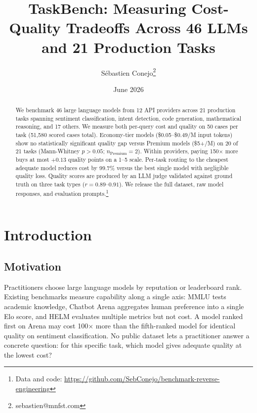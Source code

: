 \documentclass[11pt]{article}
\title{TaskBench: Measuring Cost-Quality Tradeoffs Across 46 LLMs and 21 Production Tasks}
\author{S\'{e}bastien Conejo\thanks{sebastien@mnfst.com}}
\date{June 2026}
\begin{document}
\maketitle

\begin{abstract}
We benchmark 46 large language models from 12 API providers across 21
production tasks spanning sentiment classification, intent detection,
code generation, mathematical reasoning, and 17 others.  We measure both
per-query cost and quality on 50 cases per task (51,580 scored cases
total).  Economy-tier models (\$0.05--\$0.49/M input tokens) show no
statistically significant quality gap versus Premium models (\$5+/M) on
20 of 21 tasks (Mann-Whitney $p > 0.05$; $n_{\text{Premium}} = 2$).  Within providers, paying 150$\times$ more
buys at most $+0.13$ quality points on a 1--5 scale.  Per-task routing
to the cheapest adequate model reduces cost by 99.7\% versus the best
single model with negligible quality loss.  Quality scores are produced by an LLM judge
validated against ground truth on three task types
($r = 0.89$--$0.91$).  We release the full dataset, raw model responses,
and evaluation prompts.\footnote{Data and code:
\url{https://github.com/SebConejo/benchmark-reverse-engineering}}
\end{abstract}

\section{Introduction}

\subsection{Motivation}

Practitioners choose large language models by reputation or leaderboard
rank.  Existing benchmarks measure capability along a single axis: MMLU
\citep{hendrycks2021mmlu} tests academic knowledge, Chatbot Arena
\citep{chiang2024chatbot} aggregates human preference into a single Elo
score, and HELM \citep{liang2023helm} evaluates multiple metrics but not
cost.  A model ranked first on Arena may cost 100$\times$ more than the
fifth-ranked model for identical quality on sentiment classification.  No
public dataset lets a practitioner answer a concrete question: for this
specific task, which model gives adequate quality at the lowest cost?
\end{document}
